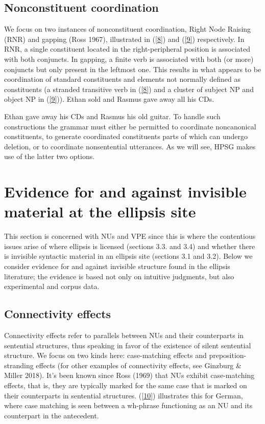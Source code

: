 \documentclass[output=paper]{langsci/langscibook}
\begin{document}
{\subsection{Nonconstituent coordination}
We focus on two instances of nonconstituent coordination, Right Node Raising (RNR) and gapping (Ross 1967), illustrated in (\ref{8}) and (\ref{9}) respectively. In RNR, a single constituent located in the right-peripheral position is associated with both conjuncts. In gapping, a finite verb is associated with both (or more) conjuncts but only present in the leftmost one. This results in what appears to be coordination of standard constituents and elements not normally defined as constituents (a stranded transitive verb in (\ref{8}) and a cluster of subject NP and object NP in (\ref{9})).
 \ea Ethan sold and Rasmus gave away all his CDs. \label{8}\z

 \ea Ethan gave away his CDs and Rasmus his old guitar. \label{9}\z
 To handle such constructions the grammar must either be permitted to coordinate noncanonical constituents, to generate coordinated constituents parts of which can undergo deletion, or to coordinate nonsentential utterances. As we will see, HPSG makes use of the latter two options.

\section{Evidence for and against invisible material at the ellipsis site}
This section is concerned with NUs and VPE since this is where the contentious issues arise of where ellipsis is licensed (sections 3.3. and 3.4) and whether there is invisible syntactic material in an ellipsis site (sections 3.1 and 3.2). Below we consider evidence for and against invisible structure found in the ellipsis literature; the evidence is based not only on intuitive judgments, but also experimental and corpus data.

\subsection{Connectivity effects}
Connectivity effects refer to parallels between NUs and their counterparts in sentential structures, thus speaking in favor of the existence of silent sentential structure. We focus on two kinds here: case-matching effects and preposition-stranding effects (for other examples of connectivity effects, see Ginzburg \& Miller 2018). It's been known since Ross (1969) that NUs exhibit case-matching effects, that is, they are typically marked for the same case that is marked on their counterparts in sentential structures. (\ref{10}) illustrates this for German, where case matching is seen between a wh-phrase functioning as an NU and its counterpart in the antecedent.

}
\end{document}
